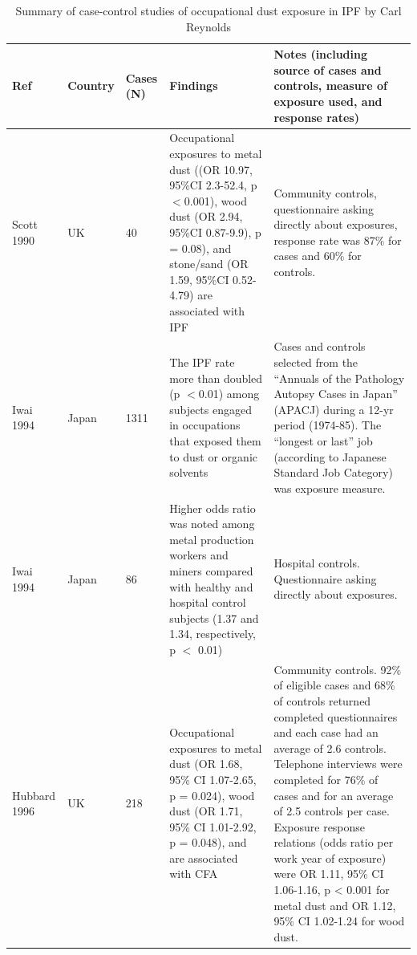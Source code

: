 \documentclass[a4paper,10pt]{article}
\begin{document}
\begin{appendices}
\newpage

\begin{table}[htbp]\centering
\caption*{Summary of case-control studies of occupational dust exposure in IPF by Carl Reynolds}


\label{OccupationalDustTable1}
\tiny	
\begin{tabular}{p{1.3cm}p{0.8cm}p{0.8cm}p{6cm}p{5cm}}
\toprule
\textbf{Ref} & \textbf{Country} & \textbf{Cases (N)} & \textbf{Findings} & \textbf{Notes (including source of cases and controls, measure of exposure used, and response rates)}\\
\midrule

Scott 1990 & UK & 40 & Occupational exposures to metal dust ((OR 10.97, 95\%CI 2.3-52.4, p\ensuremath{<}0.001), wood dust (OR 2.94, 95\%CI 0.87-9.9), p = 0.08), and stone/sand (OR 1.59, 95\%CI 0.52-4.79) are associated with IPF & Community controls, questionnaire asking directly about exposures, response rate was 87\% for cases and 60\% for controls.\\


Iwai 1994 & Japan & 1311 & The IPF rate more than doubled (p \ensuremath{<}0.01) among subjects engaged in occupations that exposed them to dust or organic solvents & Cases and controls selected from the ``Annuals of the Pathology Autopsy Cases in Japan'' (APACJ) during a 12-yr period (1974-85). The ``longest or last'' job (according to Japanese Standard Job Category) was exposure measure. \\


Iwai 1994 & Japan & 86 & Higher odds ratio was noted among metal production workers and miners compared with healthy and hospital control subjects (1.37 and 1.34, respectively, p \ensuremath{<} 0.01) & Hospital controls. Questionnaire asking directly about exposures. \\


Hubbard 1996 & UK & 218 & Occupational exposures to metal dust (OR 1.68, 95\% CI 1.07-2.65, p = 0.024), wood dust (OR 1.71, 95\% CI 1.01-2.92, p = 0.048), and are associated with CFA & Community controls. 92\% of eligible cases and 68\% of controls returned completed questionnaires and each case had an average of 2.6 controls. Telephone interviews were completed for 76\% of cases and for an average of 2.5 controls per case. Exposure response relations (odds ratio per work year of exposure) were OR 1.11, 95\% CI 1.06-1.16, p < 0.001 for metal dust and OR 1.12, 95\% CI 1.02-1.24 for wood dust. \\


\end{tabular}
\end{table}
\end{appendices}
\end{document}
